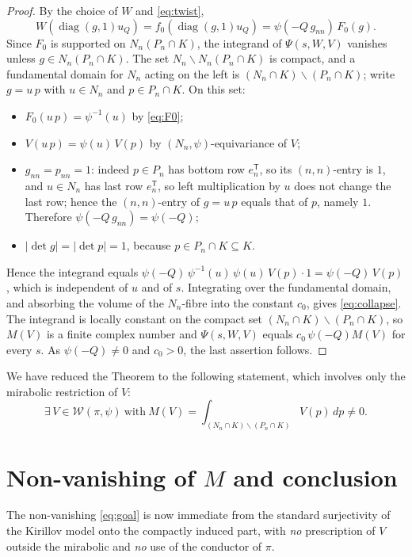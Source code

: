 \documentclass[12pt]{article}
\newcommand{\Wmod}{\mathcal{W}}
\newcommand{\diag}{\operatorname{diag}}
\begin{document}
\begin{proof}
By the choice of $W$ and \eqref{eq:twist},
\[
  W(\diag(g,1)u_Q)=f_0(\diag(g,1)u_Q)=\psi(-Q\,g_{nn})\,F_0(g).
\]
Since $F_0$ is supported on $N_n(P_n\cap K)$, the integrand of $\Psi(s,W,V)$ vanishes
unless $g\in N_n(P_n\cap K)$. The set $N_n\backslash N_n(P_n\cap K)$ is compact, and
a fundamental domain for $N_n$ acting on the left is $(N_n\cap K)\backslash(P_n\cap K)$;
write $g=u\,p$ with $u\in N_n$ and $p\in P_n\cap K$. On this set:
\begin{itemize}
\item $F_0(u\,p)=\psi^{-1}(u)$ by \eqref{eq:F0};
\item $V(u\,p)=\psi(u)\,V(p)$ by $(N_n,\psi)$-equivariance of $V$;
\item $g_{nn}=p_{nn}=1$: indeed $p\in P_n$ has bottom row $e_n^{\mathsf T}$, so its
$(n,n)$-entry is $1$, and $u\in N_n$ has last row $e_n^{\mathsf T}$, so left
multiplication by $u$ does not change the last row; hence the $(n,n)$-entry of
$g=u\,p$ equals that of $p$, namely $1$. Therefore
$\psi(-Q\,g_{nn})=\psi(-Q)$;
\item $|\det g|=|\det p|=1$, because $p\in P_n\cap K\subseteq K$.
\end{itemize}
Hence the integrand equals
$\psi(-Q)\,\psi^{-1}(u)\,\psi(u)\,V(p)\cdot1=\psi(-Q)\,V(p)$, which is independent of
$u$ and of $s$. Integrating over the fundamental domain, and absorbing the volume of
the $N_n$-fibre into the constant $c_0$, gives \eqref{eq:collapse}. The integrand is
locally constant on the compact set $(N_n\cap K)\backslash(P_n\cap K)$, so $M(V)$ is
a finite complex number and $\Psi(s,W,V)$ equals $c_0\,\psi(-Q)M(V)$ for every $s$.
As $\psi(-Q)\neq0$ and $c_0>0$, the last assertion follows.
\end{proof}

We have reduced the Theorem to the following statement, which involves only the
mirabolic restriction of $V$:
\begin{equation}\label{eq:goal}
  \boxed{\ \exists\,V\in\Wmod(\pi,\psi)\ \text{with}\
  M(V)=\int_{(N_n\cap K)\backslash(P_n\cap K)}V(p)\,dp\neq0.\ }
\end{equation}

\section{Non-vanishing of $M$ and conclusion}

The non-vanishing \eqref{eq:goal} is now immediate from the standard surjectivity of
the Kirillov model onto the compactly induced part, with \emph{no} prescription of
$V$ outside the mirabolic and \emph{no} use of the conductor of $\pi$.
\end{document}
